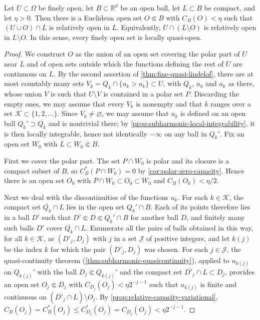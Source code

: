 \begin{proposition}\label{prop:fine-quasi-open}
Let $U\subset\Omega$ be finely open, let $B\subset\mathbb R^d$ be an open ball, let $L\subset B$ be compact, and let $\eta>0$. Then there is a Euclidean open set $O\Subset B$ with $C_B(O)<\eta$ such that $(U\cup O)\cap L$ is relatively open in $L$. Equivalently, $U\cap(L\setminus O)$ is relatively open in $L\setminus O$. In this sense, every finely open set is locally quasi-open.
\end{proposition}
\begin{proof}
We construct $O$ as the union of an open set covering the polar part of $U$ near $L$ and of open sets outside which the functions defining the rest of $U$ are continuous on $L$. By the second assertion of \cref{thm:fine-quasi-lindelof}, there are at most countably many sets $V_k=Q_k\cap\{u_k>a_k\}\subset U$, with $Q_k$, $u_k$ and $a_k$ as there, whose union $V$ is such that $U\setminus V$ is contained in a polar set $P$. Discarding the empty ones, we may assume that every $V_k$ is nonempty and that $k$ ranges over a set $\mathcal K\subset\{1,2,\ldots\}$. Since $V_k\neq\varnothing$, we may assume that $u_k$ is defined on an open ball $Q_k'\supset\overline{Q_k}$ and is nontrivial there; by \cref{prop:subharmonic-local-integrability}, it is then locally integrable, hence not identically $-\infty$ on any ball in $Q_k'$. Fix an open set $W_0$ with $L\subset W_0\Subset B$.

First we cover the polar part. The set $P\cap W_0$ is polar and its closure is a compact subset of $B$, so $C_B^*(P\cap W_0)=0$ by \cref{cor:polar-zero-capacity}. Hence there is an open set $O_0$ with $P\cap W_0\subset O_0\subset W_0$ and $C_B(O_0)<\eta/2$.

Next we deal with the discontinuities of the functions $u_k$. For each $k\in\mathcal K$, the compact set $\overline{Q_k}\cap L$ lies in the open set $Q_k'\cap B$. Each of its points therefore lies in a ball $D'$ such that $D'\Subset D\Subset Q_k'\cap B$ for another ball $D$, and finitely many such balls $D'$ cover $\overline{Q_k}\cap L$. Enumerate all the pairs of balls obtained in this way, for all $k\in\mathcal K$, as $(D'_j,D_j)$ with $j$ in a set $\mathcal J$ of positive integers, and let $k(j)$ be the index $k$ for which the pair $(D'_j,D_j)$ was chosen. For each $j\in\mathcal J$, the quasi-continuity theorem (\cref{thm:subharmonic-quasicontinuity}), applied to $u_{k(j)}$ on $Q_{k(j)}'$ with the ball $D_j\Subset Q_{k(j)}'$ and the compact set $\overline{D'_j}\cap L\subset D_j$, provides an open set $O_j\Subset D_j$ with $C_{D_j}(O_j)<\eta2^{-j-1}$ such that $u_{k(j)}$ is finite and continuous on $(\overline{D'_j}\cap L)\setminus O_j$. By \cref{prop:relative-capacity-variational}, $C_B(O_j)=C_B^*(O_j)\leq C_{D_j}^*(O_j)=C_{D_j}(O_j)<\eta2^{-j-1}$.


\end{proof}
